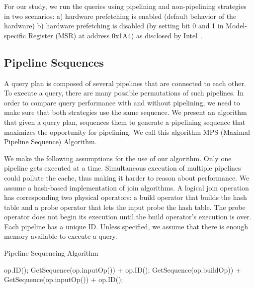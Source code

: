 For our study, we run the queries using pipelining and non-pipelining strategies in two scenarios: a) hardware prefetching is enabled (default behavior of the hardware) b) hardware prefetching is disabled (by setting bit 0 and 1 in Model-specific Register (MSR) at address 0x1A4) as disclosed by Intel~\cite{intel-prefetching}.

\subsection{Pipeline Sequences}\label{ssec:pipeline-sequencing-algo}
A query plan is composed of several pipelines that are connected to each other. 
To execute a query, there are many possible permutations of such pipelines. 
In order to compare query performance with and without pipelining, we need to make sure that both strategies use the same sequence.
We present an algorithm that given a query plan, sequences them to generate a pipelining sequence that maximizes the opportunity for pipelining. 
We call this algorithm MPS (Maximal Pipeline Sequence) Algorithm.

We make the following assumptions for the use of our algorithm. 
Only one pipeline gets executed at a time.
Simultaneous execution of multiple pipelines could pollute the cache, thus making it harder to reason about performance.
We assume a hash-based implementation of join algorithms.
A logical join operation has corresponding two physical operators: a build operator that builds the hash table and a probe operator that lets the input probe the hash table.
The probe operator does not begin its execution until the build operator's execution is over.
Each pipeline has a unique ID. 
Unless specified, we assume that there is enough memory available to execute a query. 



\begin{algorithm}
	\caption{Pipeline Sequencing Algorithm}
	\begin{algorithmic}[1]
		\State \Return op.ID();
		\EndIf
		\State \Return  GetSequence(op.inputOp()) + op.ID();
		\EndIf	
		\State \Return  GetSequence(op.buildOp)) + GetSequence(op.inputOp()) + op.ID();
		\EndIf	
		\EndFunction		
			
	\end{algorithmic}
	\label{alg:pipeline-sequence}
\end{algorithm}

